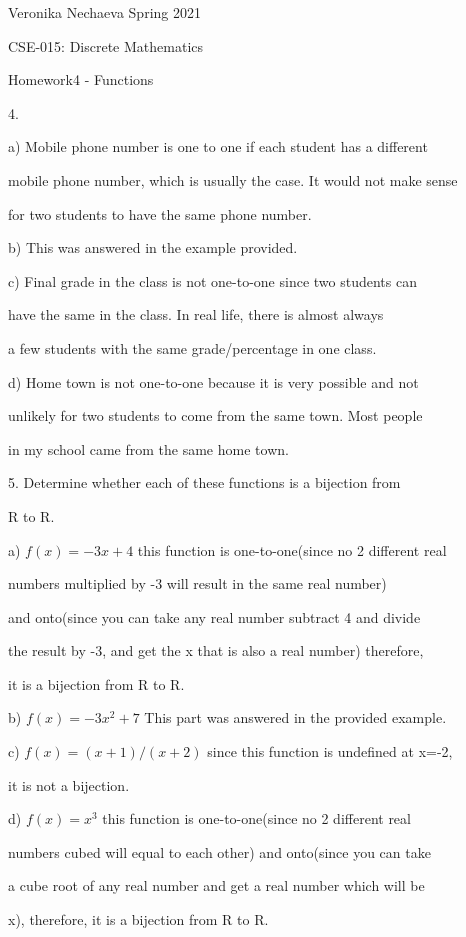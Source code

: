 \documentclass[10pt]{article}
\begin{document}
Veronika Nechaeva Spring 2021

CSE-015: Discrete Mathematics

Homework4 - Functions


4.

a) Mobile phone number is one to one if each student has a different 

mobile phone number, which is usually the case. It would not make sense

for two students to have the same phone number.

b) This was answered in the example provided.

c) Final grade in the class is not one-to-one since two students can 

have the same in the class. In real life, there is almost always 

a few students with the same grade/percentage in one class.

d) Home town is not one-to-one because it is very possible and not

unlikely for two students to come from the same town. Most people

in my school came from the same home town.


5. Determine whether each of these functions is a bijection from 

R to R.

a) $f(x)=-3x+4$ this function is one-to-one(since no 2 different real

numbers multiplied by -3 will result in the same real number) 

and onto(since you can take any real number subtract 4 and divide 

the result by -3, and get the x that is also a real number) therefore, 

it is a bijection from R to R.

b) $f(x)=-3x^2+7$ This part was answered in the provided example.

c) $f(x)=(x+1)/(x+2)$ since this function is undefined at x=-2,

it is not a bijection.

d) $f(x)=x^3$ this function is one-to-one(since no 2 different real

numbers cubed will equal to each other) and onto(since you can take

a cube root of any real number and get a real number which will be

x), therefore, it is a bijection from R to R.
\end{document}
